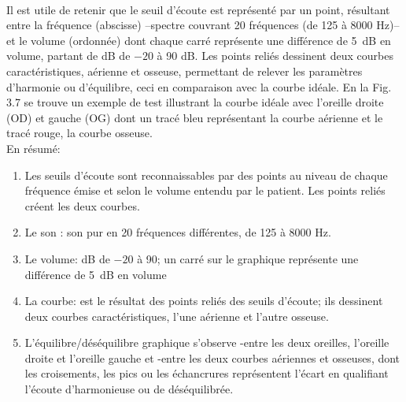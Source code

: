 \\
Il est utile de retenir
que le seuil d'écoute est représenté par un point, résultant entre la
fréquence (abscisse) --spectre couvrant 20
fréquences (de 125 à 8000 Hz)--   et le volume
(ordonnée) dont chaque carré représente une différence de \SI{5}{\dB} en
volume, partant de dB de $-20$ à 90 dB.
Les points reliés dessinent deux courbes caractéristiques, aérienne
et osseuse, permettant de relever les paramètres d'harmonie ou
          d'équilibre, ceci
 	en comparaison avec la courbe idéale. En la Fig. 3.7 se trouve un exemple de test illustrant la 
 	courbe idéale avec l'oreille 
 	droite (OD) et gauche (OG) dont un tracé bleu 
 	représentant 
 	la courbe aérienne et le tracé rouge, la courbe osseuse. 
 	 \\
 	En résumé: 
        \begin{enumerate}
 \item   Les seuils d'écoute sont reconnaissables par des points au niveau de
          chaque fréquence émise et selon le volume entendu par le
          patient. Les points reliés créent les deux courbes.
 	\item Le son : son pur en 20 fréquences différentes, de 125 à 8000 Hz.
 	\item Le volume: dB de $-20$ à 90; un carré sur le graphique représente une différence de \SI{5}{\dB} en
 		volume
 	\item La courbe: est le résultat des points reliés des seuils
          d'écoute; ils
          dessinent deux courbes caractéristiques, l'une aérienne et l'autre osseuse.
\item L'équilibre/déséquilibre graphique s'observe
        -entre les deux oreilles, l'oreille droite et l'oreille gauche
        et
        -entre les deux courbes aériennes et osseuses, dont les
        croisements, les pics ou les échancrures représentent
        l'écart en
        qualifiant l'écoute d'harmonieuse ou de
        déséquilibrée. 
      \end{enumerate}

